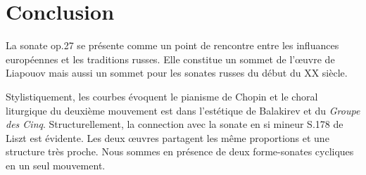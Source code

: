 \section{Conclusion}

La sonate op.27 se présente comme un point de rencontre entre les influances européennes et les traditions russes. Elle constitue un sommet de l'œuvre de Liapouov mais aussi un sommet pour les sonates russes du début du XX\ieme{} siècle.

Stylistiquement, les courbes évoquent le pianisme de Chopin et le choral liturgique du deuxième mouvement est dans l'estétique de Balakirev et du \emph{Groupe des Cinq}. Structurellement, la connection avec la sonate en si mineur S.178 de Liszt est évidente. Les deux œuvres partagent les même proportions et une structure très proche. Nous sommes en présence de deux forme-sonates cycliques en un seul mouvement.

